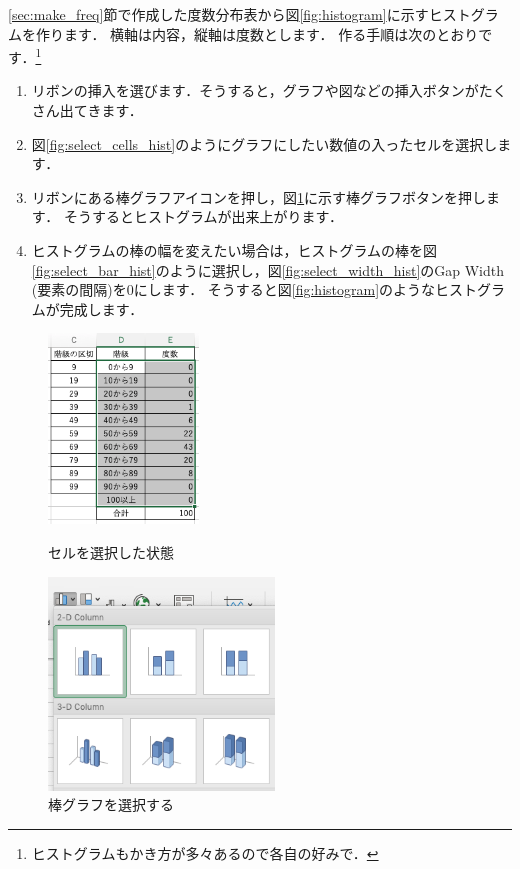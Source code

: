 \ref{sec:make_freq}節で作成した度数分布表から図\ref{fig:histogram}に示すヒストグラムを作ります．
横軸は内容，縦軸は度数とします．
作る手順は次のとおりです．\footnote{ヒストグラムもかき方が多々あるので各自の好みで．}

\begin{enumerate}
    \item リボンの挿入を選びます．そうすると，グラフや図などの挿入ボタンがたくさん出てきます．
    \item 図\ref{fig:select_cells_hist}のようにグラフにしたい数値の入ったセルを選択します．
    \item リボンにある棒グラフアイコンを押し，図\ref{fig:select_barchart_hist}に示す棒グラフボタンを押します．
    そうするとヒストグラムが出来上がります．
    \item ヒストグラムの棒の幅を変えたい場合は，ヒストグラムの棒を図\ref{fig:select_bar_hist}のように選択し，図\ref{fig:select_width_hist}のGap Width (要素の間隔)を0にします．
    そうすると図\ref{fig:histogram}のようなヒストグラムが完成します．
\end{enumerate}

\begin{figure}[htbp]
    \begin{minipage}{0.5\hsize}
        \centering
  \includegraphics[width=4cm]{chap1/select_cells_hist.png}
  \caption{セルを選択した状態}
  \label{fig:select_cells_hist}
 \end{minipage}
 \begin{minipage}{0.5\hsize}
        \centering
  \includegraphics[width=6cm]{chap1/select_barchart_hist.png}
  \caption{棒グラフを選択する}
  \label{fig:select_barchart_hist}
 \end{minipage}
\end{figure}

